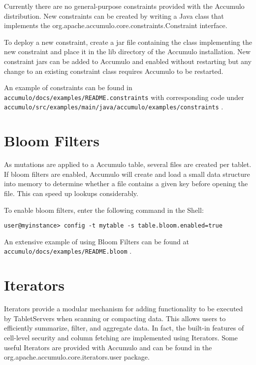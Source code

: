 Currently there are no general-purpose constraints provided with the Accumulo
distribution. New constraints can be created by writing a Java class that implements
the org.apache.accumulo.core.constraints.Constraint interface.

To deploy a new constraint, create a jar file containing the class implementing the
new constraint and place it in the lib directory of the Accumulo installation. New
constraint jars can be added to Accumulo and enabled without restarting but any
change to an existing constraint class requires Accumulo to be restarted.

An example of constraints can be found in\\
\texttt{accumulo/docs/examples/README.constraints} with corresponding code under\\
\texttt{accumulo/src/examples/main/java/accumulo/examples/constraints} .

\section{Bloom Filters}
As mutations are applied to a Accumulo table, several files are created per tablet. If
bloom filters are enabled, Accumulo will create and load a small data structure into
memory to determine whether a file contains a given key before opening the file.
This can speed up lookups considerably.

To enable bloom filters, enter the following command in the Shell:

\small
\begin{verbatim}
user@myinstance> config -t mytable -s table.bloom.enabled=true
\end{verbatim}
\normalsize

An extensive example of using Bloom Filters can be found at\\
\texttt{accumulo/docs/examples/README.bloom} .

\section{Iterators}
Iterators provide a modular mechanism for adding functionality to be executed by
TabletServers when scanning or compacting data. This allows users to efficiently
summarize, filter, and aggregate data. In fact, the built-in features of cell-level
security and column fetching are implemented using Iterators.
Some useful Iterators are provided with Accumulo and can be found in the org.apache.accumulo.core.iterators.user package.

